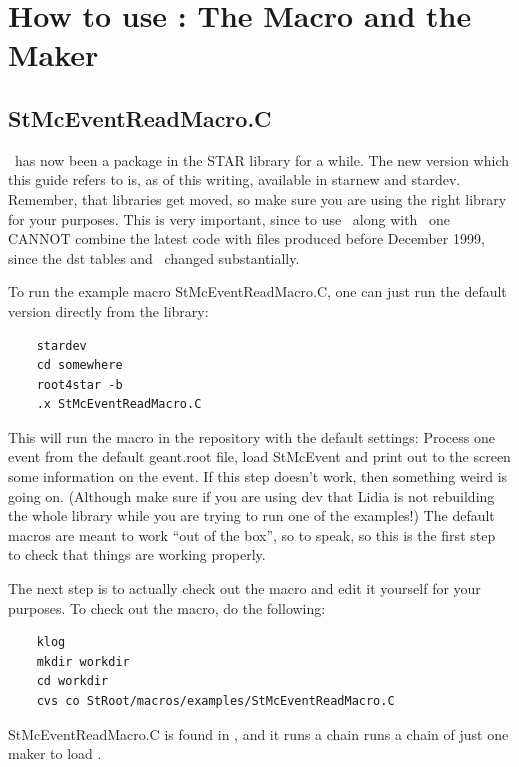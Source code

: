 
\section{How to use \StMcEvent: The Macro and the Maker}
\label{sec:howto}
\subsection{StMcEventReadMacro.C}
\StMcEvent\ has now been a package in the STAR library for a while.  The
new version which this guide refers to is, as of this writing,
available in starnew and stardev.  Remember, that libraries
get moved, so make sure you are using the right library for
your purposes.  This is very important, since to use \StMcEvent\
along with \StEvent\ one CANNOT combine the latest code with
files produced before December 1999, since the dst tables
and \StEvent\ changed substantially.

To run the example macro StMcEventReadMacro.C, one can just
run the default version directly from the library:
\begin{verbatim}
    stardev
    cd somewhere
    root4star -b
    .x StMcEventReadMacro.C
\end{verbatim}
This will run the macro in the repository with the default settings:
Process one event from the default geant.root file, load StMcEvent
and print out to the screen some information on the event.
If this step doesn't work, then something weird is going on.  (Although
make sure if you are using dev that Lidia is not rebuilding the whole
library while you are trying to run one of the examples!)  The
default macros are meant to work ``out of the box'', so to speak,
so this is the first step to check that things are working
properly.

The next step is to actually check out the macro and edit it yourself for
your purposes.  To check out the macro, do the following:
\begin{verbatim}
    klog
    mkdir workdir
    cd workdir
    cvs co StRoot/macros/examples/StMcEventReadMacro.C
\end{verbatim}

StMcEventReadMacro.C is found in
,  %
and it runs a chain runs a chain of just one maker to load \StMcEvent .



